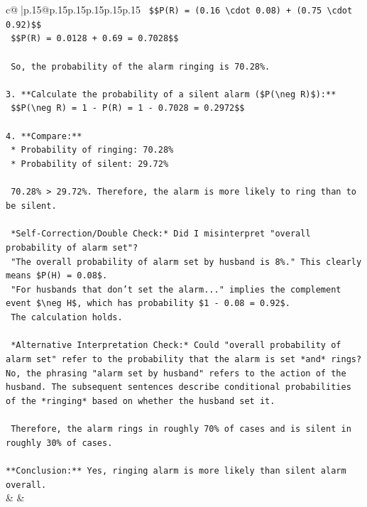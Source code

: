 \documentclass{article}
\begin{document}
{\begin{supertabular}{c@{$\;$}|p{.15\linewidth}@{}p{.15\linewidth}p{.15\linewidth}p{.15\linewidth}p{.15\linewidth}p{.15\linewidth}}
{{{\texttt{    \$\$P(R) = (0.16 \textbackslash{}cdot 0.08) + (0.75 \textbackslash{}cdot 0.92)\$\$} \\
\texttt{    \$\$P(R) = 0.0128 + 0.69 = 0.7028\$\$} \\
\\ 
\texttt{    So, the probability of the alarm ringing is 70.28\%.} \\
\\ 
\texttt{3.  **Calculate the probability of a silent alarm (\$P(\textbackslash{}neg R)\$):**} \\
\texttt{    \$\$P(\textbackslash{}neg R) = 1 {-} P(R) = 1 {-} 0.7028 = 0.2972\$\$} \\
\\ 
\texttt{4.  **Compare:**} \\
\texttt{    *   Probability of ringing: 70.28\%} \\
\texttt{    *   Probability of silent: 29.72\%} \\
\\ 
\texttt{    70.28\% > 29.72\%. Therefore, the alarm is more likely to ring than to be silent.} \\
\\ 
\texttt{    *Self{-}Correction/Double Check:* Did I misinterpret "overall probability of alarm set"?} \\
\texttt{    "The overall probability of alarm set by husband is 8\%." This clearly means \$P(H) = 0.08\$.} \\
\texttt{    "For husbands that don't set the alarm..." implies the complement event \$\textbackslash{}neg H\$, which has probability \$1 {-} 0.08 = 0.92\$.} \\
\texttt{    The calculation holds.} \\
\\ 
\texttt{    *Alternative Interpretation Check:* Could "overall probability of alarm set" refer to the probability that the alarm is set *and* rings? No, the phrasing "alarm set by husband" refers to the action of the husband. The subsequent sentences describe conditional probabilities of the *ringing* based on whether the husband set it.} \\
\\ 
\texttt{    Therefore, the alarm rings in roughly 70\% of cases and is silent in roughly 30\% of cases.} \\
\\ 
\texttt{**Conclusion:** Yes, ringing alarm is more likely than silent alarm overall.} \\
            }
        }
    }
    & & \\ \\


\end{supertabular}}
\end{document}
